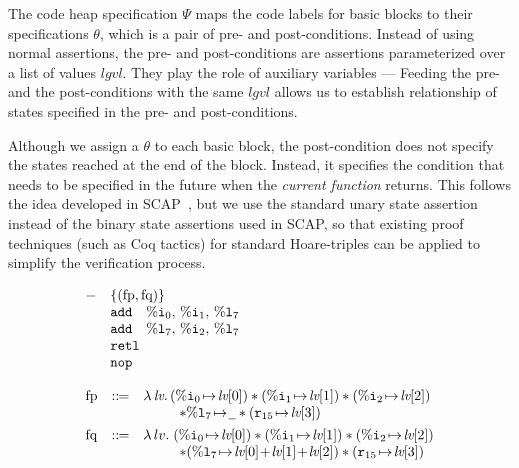 The code heap specification $\Psi$ maps the code labels
for basic blocks to their specifications $\theta$,
which is a pair of pre- and post-conditions.
Instead of using normal assertions, the pre- and
post-conditions are assertions parameterized over
a list of values $lgvl$. They play the role
of auxiliary variables --- Feeding the pre-
and the post-conditions with the same $lgvl$ allows
us to establish relationship of states specified
in the pre- and post-conditions.

Although we assign a $\theta$ to each basic block,
the post-condition does not specify the states reached at the end
of the block. Instead, it specifies the condition
that needs to be specified in the future when the
{\em current function} returns. This follows the idea
developed in SCAP~\cite{Feng06pldi}, but we use the
standard unary state assertion instead of the binary
state assertions used in SCAP, so that existing
proof techniques (such as Coq tactics) for standard
Hoare-triples can be applied to simplify the verification
process.

\begin{center}
	\vspace*{-2em}
	$$
	\begin{array}{l}
		\begin{array}{ll}
			- & \{(\text{fp}, \text{fq})\} \\
			& \cadd \quad \ireg{0}, \, \ireg{1}, \, \lreg{7} \\
			& \cadd \quad \lreg{7}, \, \ireg{2}, \, \lreg{7} \\
			& \retl \\
			& \nop
		\end{array} \\
		\\
		\begin{array}{lcl}
			\text{fp} & \define &
			\lambda \, \lv.\, 
			(\regst{\ireg{0}}{\lv[0]})
			* (\regst{\ireg{1}}{\lv[1]})
			* (\regst{\ireg{2}}{\lv[2]}) \\
			& &
			\hspace*{6ex} * \regst{\lreg{7}}{\notCare}
						  * (\regst{\reg{15}}{\lv[3]}) \\

			
			\\[-8pt]
			
			\text{fq} & \define & \lambda \, lv. \;
			(\regst{\ireg{0}}{\lv[0]})
			* (\regst{\ireg{1}}{\lv[1]})
			* (\regst{\ireg{2}}{\lv[2]}) \\
			& &
			\hspace*{6ex}
			* (\regst{\lreg{7}}{\lv[0] \!+\! \lv[1] \!+\! \lv[2]})
						  * (\regst{\reg{15}}{\lv[3]})
		\end{array}
	\end{array}
	$$
	\vspace*{-0.5em}
	\label{fig:functionSpec}
\end{center}

